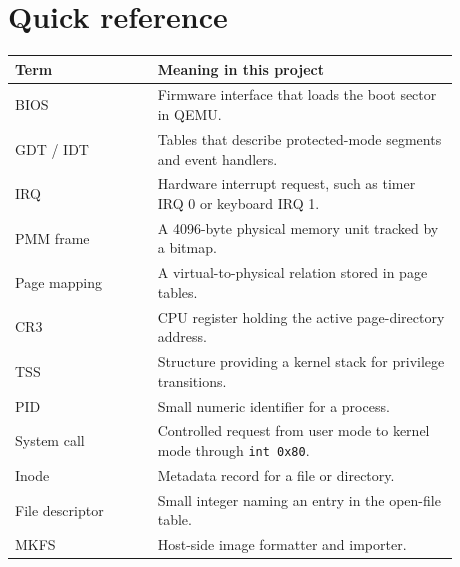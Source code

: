 \documentclass[11pt,oneside]{book}
\newcommand{\pathname}[1]{\texttt{\detokenize{#1}}}
\begin{document}
\appendix


\backmatter
\chapter*{Quick reference}
\begin{longtable}{p{0.29\linewidth}p{0.59\linewidth}}
\textbf{Term} & \textbf{Meaning in this project}\\ \hline
BIOS & Firmware interface that loads the boot sector in QEMU.\\
GDT / IDT & Tables that describe protected-mode segments and event handlers.\\
IRQ & Hardware interrupt request, such as timer IRQ 0 or keyboard IRQ 1.\\
PMM frame & A 4096-byte physical memory unit tracked by a bitmap.\\
Page mapping & A virtual-to-physical relation stored in page tables.\\
CR3 & CPU register holding the active page-directory address.\\
TSS & Structure providing a kernel stack for privilege transitions.\\
PID & Small numeric identifier for a process.\\
System call & Controlled request from user mode to kernel mode through \texttt{int 0x80}.\\
Inode & Metadata record for a file or directory.\\
File descriptor & Small integer naming an entry in the open-file table.\\
MKFS & Host-side image formatter and \pathname{rootfs} importer.\\
\end{longtable}
\end{document}
